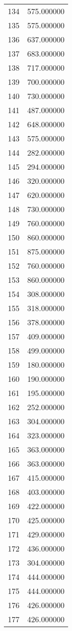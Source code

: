 \documentclass[12pt]{article}
\begin{document}
\begin{longtable}{@{}cc@{}}
134 & 575.000000 \\
135 & 575.000000 \\
136 & 637.000000 \\
137 & 683.000000 \\
138 & 717.000000 \\
139 & 700.000000 \\
140 & 730.000000 \\
141 & 487.000000 \\
142 & 648.000000 \\
143 & 575.000000 \\
144 & 282.000000 \\
145 & 294.000000 \\
146 & 320.000000 \\
147 & 620.000000 \\
148 & 730.000000 \\
149 & 760.000000 \\
150 & 860.000000 \\
151 & 875.000000 \\
152 & 760.000000 \\
153 & 860.000000 \\
154 & 308.000000 \\
155 & 318.000000 \\
156 & 378.000000 \\
157 & 409.000000 \\
158 & 499.000000 \\
159 & 180.000000 \\
160 & 190.000000 \\
161 & 195.000000 \\
162 & 252.000000 \\
163 & 304.000000 \\
164 & 323.000000 \\
165 & 363.000000 \\
166 & 363.000000 \\
167 & 415.000000 \\
168 & 403.000000 \\
169 & 422.000000 \\
170 & 425.000000 \\
171 & 429.000000 \\
172 & 436.000000 \\
173 & 304.000000 \\
174 & 444.000000 \\
175 & 444.000000 \\
176 & 426.000000 \\
177 & 426.000000 \\

\end{longtable}
\end{document}
